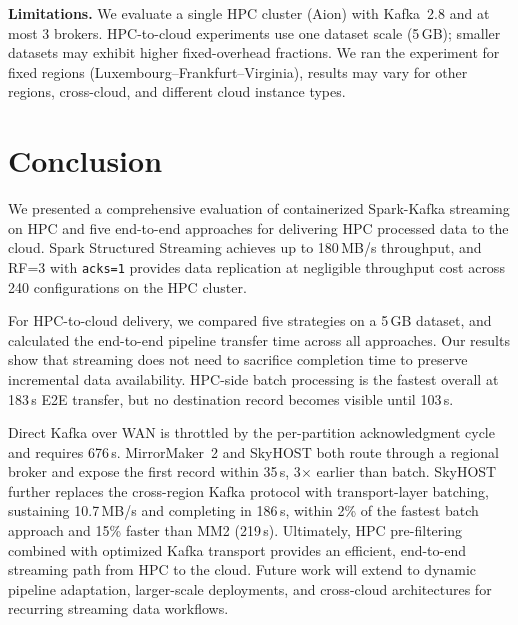 \documentclass[runningheads]{llncs}
\begin{document}
\textbf{Limitations.} We evaluate a single HPC cluster (Aion) with Kafka~2.8 and at most 3 brokers. HPC-to-cloud experiments use one dataset scale (5\,GB); smaller datasets may exhibit higher fixed-overhead fractions. We ran the experiment for fixed regions (Luxembourg--Frankfurt--Virginia), results may vary for other regions, cross-cloud, and different cloud instance types.




\section{Conclusion}
\label{sec:conclusion}

We presented a comprehensive evaluation of containerized Spark-Kafka streaming on HPC and five end-to-end approaches for delivering HPC processed data to the cloud. Spark Structured Streaming achieves up to 180\,MB/s throughput, and RF=3 with \texttt{acks=1} provides data replication at negligible throughput cost across 240 configurations on the HPC cluster. 

For HPC-to-cloud delivery, we compared five strategies on a 5\,GB dataset, and calculated the end-to-end pipeline transfer time across all approaches. Our results show that streaming does not need to sacrifice completion time to preserve incremental data availability. HPC-side batch processing is the fastest overall at 183\,s E2E transfer, but no destination record becomes visible until 103\,s. 

Direct Kafka over WAN is throttled by the per-partition acknowledgment cycle and requires 676\,s. MirrorMaker~2 and SkyHOST both route through a regional broker and expose the first record within 35\,s, 3$\times$ earlier than batch. SkyHOST further replaces the cross-region Kafka protocol with transport-layer batching, sustaining 10.7\,MB/s and completing in 186\,s, within 2\% of the fastest batch approach and 15\% faster than MM2 (219\,s). Ultimately, HPC pre-filtering combined with optimized Kafka transport provides an efficient, end-to-end streaming path from HPC to the cloud. Future work will extend to dynamic pipeline adaptation, larger-scale deployments, and cross-cloud architectures for recurring streaming data workflows.
\end{document}
